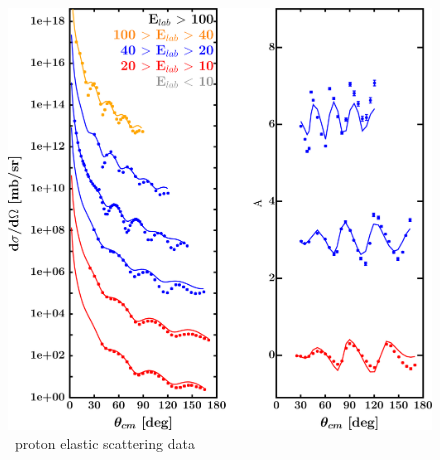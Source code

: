 \label{sn124DOMOutput}
\begin{figure}[H]
    \centering
    \begin{minipage}{0.45\textwidth}
        \centering
        \includegraphics[width=1.0\textwidth]{figures/sn124_protonElastic.png}
        \caption{\snFour\ proton elastic scattering data}
        \label{DOMFitData_sn124_proton_elastic}
    \end{minipage}\hfill
    \begin{minipage}{0.45\textwidth}
        \centering

\end{minipage}
\end{figure}
